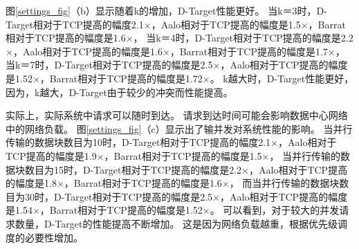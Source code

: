 图\ref{settings_fig}（b）显示随着k的增加，D-Target性能更好。
当k＝3时，D-Target相对于TCP提高的幅度2.1$\times$，Aalo相对于TCP提高的幅度是1.5$\times$，Barrat相对于TCP提高的幅度是1.6$\times$，
当k＝4时，D-Target相对于TCP提高的幅度是2.2$\times$，Aalo相对于TCP提高的幅度是1.6$\times$，Barrat相对于TCP提高的幅度是1.7$\times$，
当k＝7时，D-Target相对于TCP提高的幅度是2.5$\times$，Aalo相对于TCP提高的幅度是1.52$\times$，Barrat相对于TCP提高的幅度是1.72$\times$。
k越大时，D-Target性能更好，因为，k越大，D-Target由于较少的冲突而性能提高。

实际上，实际系统中请求可以随时到达。
请求到达时间可能会影响数据中心网络中的网络负载。
图\ref{settings_fig}（c）显示出了输并发对系统性能的影响。
当并行传输的数据块数目为10时，D-Target相对于TCP提高的幅度2.1$\times$，Aalo相对于TCP提高的幅度是1.9$\times$，Barrat相对于TCP提高的幅度是1.5$\times$，
当并行传输的数据块数目为15时，D-Target相对于TCP提高的幅度是2.2$\times$，Aalo相对于TCP提高的幅度是1.8$\times$，Barrat相对于TCP提高的幅度是1.6$\times$，
而当并行传输的数据块数目为30时，D-Target相对于TCP提高的幅度是2.5$\times$，Aalo相对于TCP提高的幅度是1.54$\times$，Barrat相对于TCP提高的幅度是1.52$\times$。
可以看到，对于较大的并发请求数量，D-Target的性能提高不断增加。
这是因为网络负载越重，根据优先级调度的必要性增加。

